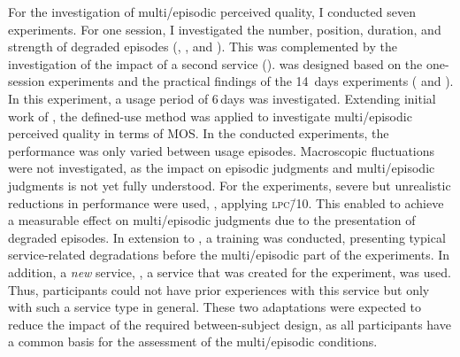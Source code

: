 For the investigation of multi\-/episodic perceived quality, I conducted seven experiments.
For one session, I investigated the number, position, duration, and strength of degraded episodes (, \EIIa{}, and ).
This was complemented by the investigation of the impact of a second service (\EIIb{}).
 was designed based on the one-session experiments and the practical findings of the 14~days experiments ( and ).
In this experiment, a usage period of 6\,days was investigated.
Extending initial work of \citet{moller_single-call_2011}, the defined-use method was applied to investigate multi\-/episodic perceived quality in terms of \ac{MOS}.
In the conducted experiments, the performance was only varied between usage episodes.
Macroscopic fluctuations were not investigated, as the impact on episodic judgments and multi\-/episodic judgments is not yet fully understood.
For the experiments, severe but unrealistic reductions in performance were used, \ie, applying \textsc{\lowercase{LPC\=/10}}.
This enabled to achieve a measurable effect on multi\-/episodic judgments due to the presentation of degraded episodes.
In extension to \citet{moller_single-call_2011}, a training was conducted, presenting typical service-related degradations before the multi\-/episodic part of the experiments.
In addition, a \emph{new} service, \ie, a service that was created for the experiment, was used.
Thus, participants could not have prior experiences with this service but only with such a service type in general.
These two adaptations were expected to reduce the impact of the required between-subject design, as all participants have a common basis for the assessment of the multi\-/episodic conditions.


